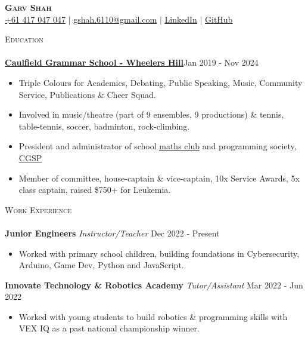 \documentclass[a4paper]{article}
\newcommand{\lineunder} {
    \vspace*{-8pt} \\
    \hspace*{-10pt} \hrulefill \\
}
\newcommand{\header} [1] {
    {\hspace*{-10pt}\vspace*{6pt} \textsc{#1}}
    \vspace*{-6pt} \lineunder
}
\begin{document}

\begin{center}
    \textbf{\Huge \scshape Garv Shah} \\ \vspace{1pt}
    \small \href{tel:+61417047047}{+61 417 047 047} $|$ \href{mailto:gshah.6110@gmail.com}{gshah.6110@gmail.com} $|$
    \href{https://www.linkedin.com/in/garvshah/}{\ul{LinkedIn}} $|$
    \href{https://garv-shah.github.io/}{\ul{GitHub}}
\end{center}
\vspace{-2mm}

\header{Education}
\href{https://www.caulfieldgs.vic.edu.au/wheelers-hill/}{\textbf{\ul{Caulfield Grammar School - Wheelers Hill}}}\hfill Jan 2019 - Nov 2024\\
\vspace{-2mm}
\begin{itemize} \itemsep 1pt
	\item Triple Colours for Academics, Debating, Public Speaking, Music, Community Service, Publications \& Cheer Squad.
        \item Involved in music/theatre (part of 9 ensembles, 9 productions) \& tennis, table-tennis, soccer, badminton, rock-climbing.
        \item President and administrator of school \href{https://cgs-math.github.io/}{\ul{maths club}} and programming society, \href{https://cgs-programming.github.io}{\ul{CGSP}}
        \item Member of committee, house-captain \& vice-captain, 10x Service Awards, 5x class captain, raised \$750+ for Leukemia.
\end{itemize}
\vspace{-2mm}

\header{Work Experience}

\textbf{Junior Engineers} \textit{Instructor/Teacher} \hfill Dec 2022 - Present\\
\vspace{-3mm}
\begin{itemize} \itemsep 0.5pt
    \item Worked with primary school children, building foundations in Cybersecurity, Arduino, Game Dev, Python and JavaScript.
\end{itemize}
\vspace{-2mm}

\textbf{Innovate Technology \& Robotics Academy} \textit{Tutor/Assistant} \hfill Mar 2022 - Jun 2022\\
\vspace{-3mm}
\begin{itemize} \itemsep 0.5pt
	\item Worked with young students to build robotics \& programming skills with VEX IQ as a past national championship winner.
\end{itemize}
\vspace{-2mm}
\end{document}
